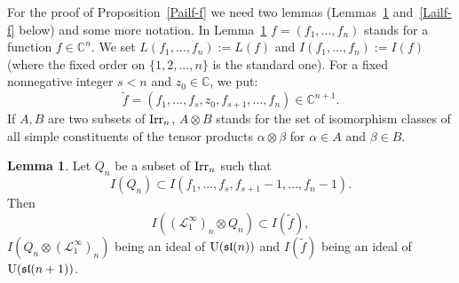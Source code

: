 \documentclass[10pt]{amsart}\oddsidemargin -1mm \evensidemargin -1mm \topmargin -15mm\headheight5mm \headsep 3.5mm \textheight 245mm\textwidth 170mm %
\theoremstyle{definition}\newtheorem{theorem}{Theorem}[section]\newtheorem{lemma}[theorem]{Lemma}\newtheorem{remark}[theorem]{Remark}\newtheorem{proposition}[theorem]{Proposition}\newtheorem{corollary}[theorem]{Corollary}\newtheorem{definition}[theorem]{Definition}\newtheorem{Ex}[theorem]{Example}
\begin{document}
For the proof of Proposition~\ref{Pailf-f} we need two lemmas (Lemmas~\ref{Lre} and~\ref{Lailf-f} below) and some more notation. In Lemma~\ref{Lre} $f=(f_1, ..., f_n)$ stands for a function $f\in\mathbb C^n$. We set $L(f_1,..., f_n):=L(f)$ and $I(f_1,..., f_n):=I(f)$ (where the fixed order on $\{1, 2,..., n\}$ is the standard one). For a fixed nonnegative integer $s< n$ and $z_0\in\mathbb C$, we put:  $$\tilde f=(f_1,..., f_s, z_0, f_{s+1},..., f_n)\in\mathbb C^{n+1}.$$
If $A, B$ are two subsets of $\operatorname{\mathrm{Irr}}_n$, $A\otimes B$ stands for the set of isomorphism classes of all simple constituents of the tensor products $\alpha\otimes \beta$ for $\alpha\in A$ and $\beta\in B$.
\begin{lemma}\label{Lre}Let $Q_n$ be a subset of $\operatorname{\mathrm{Irr}}_n$ such that $$ I(Q_n)\subset I(f_1,..., f_s, f_{s+1}-1,..., f_n-1).$$ Then $$I((\mathcal L_1^\infty)_n\otimes Q_n)\subset I(\tilde f),$$ $I(Q_n\otimes (\mathcal L_1^\infty)_n)$ being an ideal of $\operatorname{\mathrm{U}}(\frak{sl}(n))$ and $I(\tilde f)$ being an ideal of $\operatorname{\mathrm{U}}(\frak{sl}(n+1))$.\end{lemma}
\end{document}
